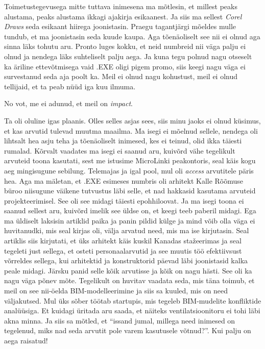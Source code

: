 Toimetustegevusega mitte tuttava inimesena ma mõtlesin, et millest peaks alustama, peaks alustama ikkagi ajakirja esikaanest. Ja siis ma sellest \emph{Corel Draws} seda esikaant  hiirega joonistasin. Praegu tagantjärgi mõeldes mulle tundub, et ma joonistasin seda kuude kaupa. Aga tõenäoliselt see nii ei olnud aga sinna läks tohutu aru. Pronto luges kokku, et neid numbreid nii väga palju ei olnud ja nendega läks suhteliselt palju aega. Ja kuna tegu polnud nagu otseselt ka äriline ettevõtmisega vaid .EXE oligi pigem promo, siis keegi nagu väga ei survestanud seda aja poolt ka. Meil ei olnud nagu kohustust, meil ei olnud tellijaid, et ta peab nüüd iga kuu ilmuma.


No vot, me ei adunud, et meil on \emph{impact}.


Ta oli oluline igas plaanis. Olles selles asjas sees, siis minu jaoks ei olnud  küsimus, et kas arvutid tulevad muutma maailma. Ma isegi ei mõelnud sellele, nendega oli lihtsalt hea asju teha ja  tõenäoliselt inimesed, kes ei teinud, olid ikka täiesti rumalad. Kõrvalt vaadates ma isegi ei saanud aru, kuivõrd vähe tegelikult arvuteid toona kasutati, sest me istusime MicroLinki peakontoris, seal käis kogu aeg mingisugune sebilung. Telemajas ja igal pool, mul oli \emph{access} arvutitele päris hea. Aga ma mäletan, et .EXE  esimeses numbris  oli arhitekt Kalle Rõõmuse büroo niisugune väikene tutvustus  läbi selle, et nad hakkasid kasutama arvuteid projekteerimisel. See oli see midagi täiesti epohhiloovat. Ja ma isegi toona ei saanud sellest aru, kuivõrd imelik see  üldse on, et keegi teeb  paberil midagi. Ega  ma üldiselt  laksisin artiklid paika ja panin pildid külge ja mind võib olla väga ei huvitanudki, mis seal kirjas oli, välja arvatud need, mis ma ise kirjutasin. Seal artiklis siis kirjutati, et üks arhitekt käis  kuskil Kanadas stažeerimas ja seal tegeleti just sellega, et osteti personaalarvutid ja see  muutis  töö efektiivsust võrreldes sellega, kui arhitektid ja konstruktorid päevad läbi joonistasid kalka peale midagi.  Järsku panid selle kõik arvutisse ja kõik on nagu hästi. See oli ka nagu väga põnev mõte. Tegelikult on huvitav vaadata seda, mis täna toimub, et meil on see nii-öelda BIM-modelleerimine ja siis sa kuuled, mis on need  väljakutsed. Mul üks sõber töötab startupis, mis tegeleb BIM-mudelite konfliktide analüüsiga. Et  kuidagi üritada aru saada, et näiteks ventilatsioonitoru ei tohi läbi akna minna. Ja siis sa mõtled, et \enquote{issand jumal, millega need inimesed on tegelenud, miks nad seda arvutit pole varem kasutusele võtnud?}. Kui palju on aega raisatud!

